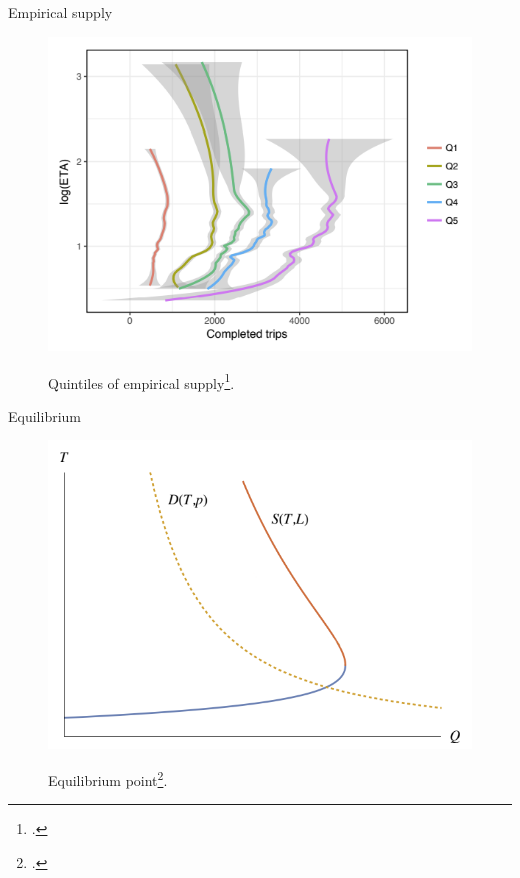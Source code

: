     \begin{frame}{Empirical supply}
        \begin{figure}
            \centering
            {\includegraphics[scale=0.35]{plots/empirical_supply.png}}
            \caption{Quintiles of empirical supply\footcite{castillo2017surge}.}
        \end{figure}
    \end{frame}

    \begin{frame}{Equilibrium}
        \begin{figure}
            \centering
            {\includegraphics[scale=0.30]{plots/equilibrium.png}}
            \caption{Equilibrium point\footcite{castillo2017surge}.}
        \end{figure}
    \end{frame}

